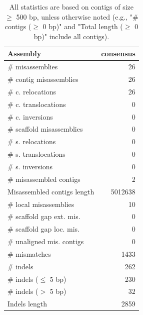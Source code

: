 \documentclass[12pt,a4paper]{article}
\begin{document}
\begin{table}[ht]
\begin{center}
\caption{All statistics are based on contigs of size $\geq$ 500 bp, unless otherwise noted (e.g., "\# contigs ($\geq$ 0 bp)" and "Total length ($\geq$ 0 bp)" include all contigs).}
\begin{tabular}{|l*{1}{|r}|}
\hline
Assembly & consensus \\ \hline
\# misassemblies & 26 \\ \hline
\hspace{2mm}\# contig misassemblies & 26 \\ \hline
\hspace{5mm}\# c. relocations & 26 \\ \hline
\hspace{5mm}\# c. translocations & 0 \\ \hline
\hspace{5mm}\# c. inversions & 0 \\ \hline
\hspace{2mm}\# scaffold misassemblies & 0 \\ \hline
\hspace{5mm}\# s. relocations & 0 \\ \hline
\hspace{5mm}\# s. translocations & 0 \\ \hline
\hspace{5mm}\# s. inversions & 0 \\ \hline
\# misassembled contigs & 2 \\ \hline
Misassembled contigs length & 5012638 \\ \hline
\# local misassemblies & 10 \\ \hline
\# scaffold gap ext. mis. & 0 \\ \hline
\# scaffold gap loc. mis. & 0 \\ \hline
\# unaligned mis. contigs & 0 \\ \hline
\# mismatches & 1433 \\ \hline
\# indels & 262 \\ \hline
\hspace{5mm}\# indels ($\leq$ 5 bp) & 230 \\ \hline
\hspace{5mm}\# indels ($>$ 5 bp) & 32 \\ \hline
Indels length & 2859 \\ \hline
\end{tabular}
\end{center}
\end{table}
\end{document}
